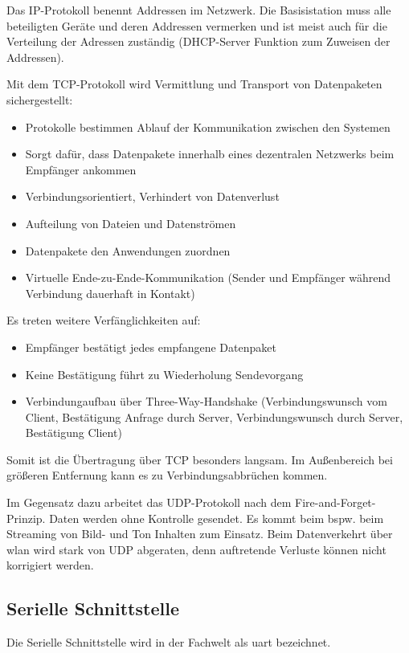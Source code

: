 Das IP-Protokoll benennt Addressen im Netzwerk. Die Basisistation muss alle beteiligten Geräte und deren Addressen vermerken und ist meist auch für die Verteilung der Adressen zuständig (DHCP-Server Funktion zum Zuweisen der Addressen).

Mit dem TCP-Protokoll wird Vermittlung und Transport von Datenpaketen sichergestellt:
\begin{itemize}
    \item Protokolle bestimmen Ablauf der Kommunikation zwischen den Systemen %
    \item Sorgt dafür, dass Datenpakete innerhalb eines dezentralen Netzwerks beim Empfänger ankommen
	\item Verbindungsorientiert, Verhindert von Datenverlust
    \item Aufteilung von Dateien und Datenströmen
    \item Datenpakete den Anwendungen zuordnen
	\item Virtuelle Ende-zu-Ende-Kommunikation (Sender und Empfänger während Verbindung dauerhaft in Kontakt)
\end{itemize}
Es treten weitere Verfänglichkeiten auf:
\begin{itemize}
    \item Empfänger bestätigt jedes empfangene Datenpaket
    \item Keine Bestätigung führt zu Wiederholung Sendevorgang
	\item Verbindungaufbau über Three-Way-Handshake (Verbindungswunsch vom Client, Bestätigung Anfrage durch Server, Verbindungswunsch durch Server, Bestätigung Client)
\end{itemize}

Somit ist die Übertragung über TCP besonders langsam. Im Außenbereich bei größeren Entfernung kann es zu Verbindungsabbrüchen kommen.

Im Gegensatz dazu arbeitet das UDP-Protokoll nach dem Fire-and-Forget-Prinzip. Daten werden ohne Kontrolle gesendet. Es kommt beim bspw. beim Streaming von Bild- und Ton Inhalten zum Einsatz. Beim Datenverkehrt über \gls{wlan} wird stark von UDP abgeraten, denn auftretende Verluste können nicht korrigiert werden.

\subsection{Serielle Schnittstelle}
Die Serielle Schnittstelle wird in der Fachwelt als \gls{uart} bezeichnet.

